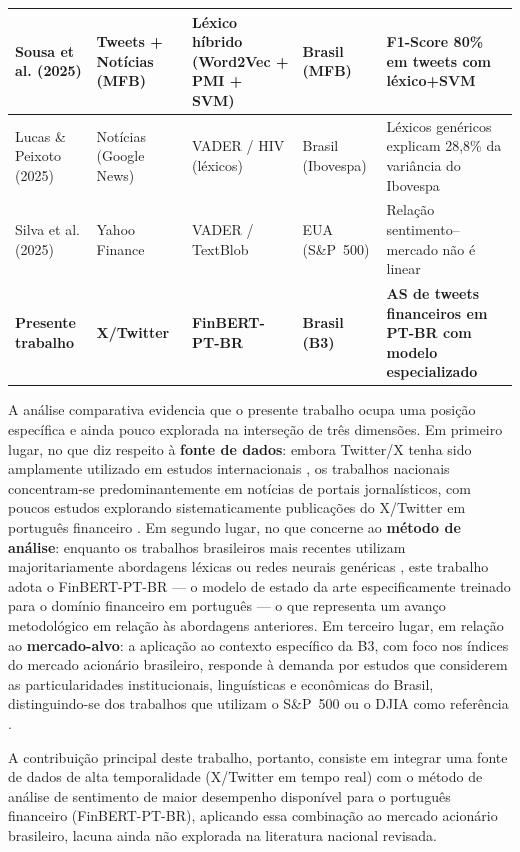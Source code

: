 \begin{table}[htb]
{\begin{tabular}{p{3.5cm} p{3.2cm} p{3.5cm} p{2.8cm} p{4.5cm}}
			Sousa et al. (2025) & Tweets + Notícias (MFB) & Léxico híbrido (Word2Vec + PMI + SVM) & Brasil (MFB) & F1-Score 80\% em tweets com léxico+SVM \\
			\hline
			Lucas \& Peixoto (2025) & Notícias (Google News) & VADER / HIV (léxicos) & Brasil (Ibovespa) & Léxicos genéricos explicam 28,8\% da variância do Ibovespa \\
			\hline
			Silva et al. (2025) & Yahoo Finance & VADER / TextBlob & EUA (S\&P~500) & Relação sentimento--mercado não é linear \\
			\hline
			\textbf{Presente trabalho} & \textbf{X/Twitter} & \textbf{FinBERT-PT-BR} & \textbf{Brasil (B3)} & \textbf{AS de tweets financeiros em PT-BR com modelo especializado} \\
			\hline
		\end{tabular}%
	}
\end{table}

A análise comparativa evidencia que o presente trabalho ocupa uma posição específica e ainda pouco explorada na interseção de três dimensões. Em primeiro lugar, no que diz respeito à \textbf{fonte de dados}: embora Twitter/X tenha sido amplamente utilizado em estudos internacionais \cite{bollen2011,ranco2015}, os trabalhos nacionais concentram-se predominantemente em notícias de portais jornalísticos, com poucos estudos explorando sistematicamente publicações do X/Twitter em português financeiro \cite{sousa2025}. Em segundo lugar, no que concerne ao \textbf{método de análise}: enquanto os trabalhos brasileiros mais recentes utilizam majoritariamente abordagens léxicas \cite{lucas2025,sousa2025} ou redes neurais genéricas \cite{silva2025}, este trabalho adota o FinBERT-PT-BR --- o modelo de estado da arte especificamente treinado para o
domínio financeiro em português --- o que representa um avanço metodológico em relação às abordagens anteriores. Em terceiro lugar, em relação ao \textbf{mercado-alvo}: a aplicação ao contexto específico da B3, com foco nos índices do mercado acionário brasileiro, responde à demanda por estudos que considerem as particularidades institucionais, linguísticas e econômicas do Brasil, distinguindo-se dos trabalhos que utilizam o S\&P~500 ou o DJIA como referência \cite{silva2025,bollen2011}.

A contribuição principal deste trabalho, portanto, consiste em integrar uma fonte de dados de alta temporalidade (X/Twitter em tempo real) com o método de análise de sentimento de maior desempenho disponível para o português financeiro (FinBERT-PT-BR), aplicando essa combinação ao mercado acionário brasileiro, lacuna ainda não explorada na literatura nacional revisada.